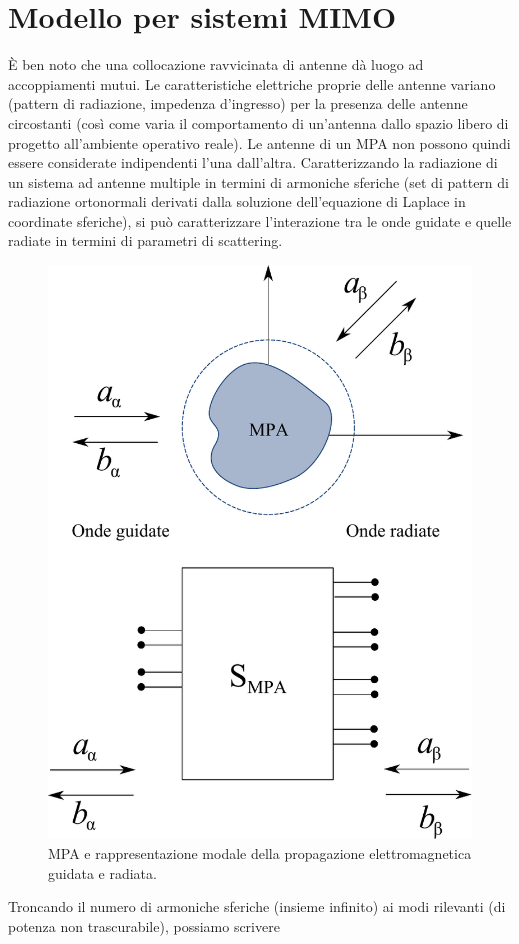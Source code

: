 \documentclass[technote]{IEEEtran}
\begin{document}
\section{Modello per sistemi MIMO}

\par È ben noto che una collocazione ravvicinata di antenne dà luogo ad accoppiamenti mutui. Le caratteristiche elettriche proprie delle antenne variano (pattern di radiazione, impedenza d'ingresso) per la presenza delle antenne circostanti (così come varia il comportamento di un'antenna dallo spazio libero di progetto all'ambiente operativo reale). Le antenne di un MPA non possono quindi essere considerate indipendenti l'una dall'altra. Caratterizzando la radiazione di un sistema ad antenne multiple in termini di armoniche sferiche (set di pattern di radiazione ortonormali derivati dalla soluzione dell'equazione di Laplace in coordinate sferiche), si può caratterizzare l'interazione tra le onde guidate e quelle radiate in termini di parametri di scattering.
\begin{figure}[!ht]
\centering
\includegraphics[width=0.7\columnwidth]{figure12}
\caption{MPA e rappresentazione modale della propagazione elettromagnetica guidata e radiata.}
\label{fig:12}
\end{figure} Troncando il numero di armoniche sferiche (insieme infinito) ai modi rilevanti (di potenza non trascurabile), possiamo scrivere
\end{document}
